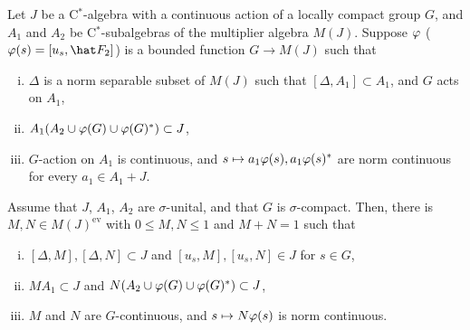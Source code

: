 \documentclass{../../large}
\begin{document}
\begin{prb}
Let $J$ be a C$^*$-algebra with a continuous action of a locally compact group $G$, and $A_1$ and $A_2$ be C$^*$-subalgebras of the multiplier algebra $M(J)$.
Suppose $\varphi$ ($\f(s)=[u_s,\hat F_2]$) is a bounded function $G\to M(J)$ such that
\begin{enumerate}[(i)]
\item $\Delta$ is a norm separable subset of $M(J)$ such that $[\Delta,A_1]\subset A_1$, and $G$ acts on $A_1$,
\item $A_1(A_2\cup\varphi(G)\cup\varphi(G)^*)\subset J$,
\item $G$-action on $A_1$ is continuous, and $s\mapsto a_1\varphi(s),a_1\varphi(s)^*$ are norm continuous for every $a_1\in A_1+J$.
\end{enumerate}
Assume that $J$, $A_1$, $A_2$ are $\sigma$-unital, and that $G$ is $\sigma$-compact.
Then, there is $M,N\in M(J)^{\mathrm{ev}}$ with $0\le M,N\le1$ and $M+N=1$ such that
\begin{enumerate}[(i)]
\item $[\Delta,M],[\Delta,N]\subset J$ and $[u_s,M],[u_s,N]\in J$ for $s\in G$,
\item $MA_1\subset J$ and $N(A_2\cup\varphi(G)\cup\varphi(G)^*)\subset J$,
\item $M$ and $N$ are $G$-continuous, and $s\mapsto N\varphi(s)$ is norm continuous.
\end{enumerate}
\end{prb}
\end{document}
